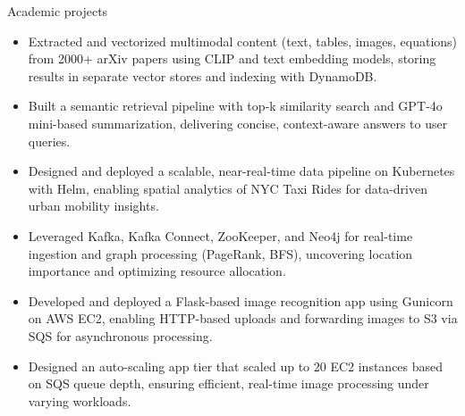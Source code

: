 \documentclass{resume}
\begin{document}
\begin{experienceSection}{Academic projects}

    \projectItem[
        title=RAG Implementation for arXiv Papers,
        duration={Oct 2024 - Nov 2024},
    ]
    \begin{itemize}
        \vspace{-0.5em}
        \itemsep -6pt {}
        \item Extracted and vectorized multimodal content (text, tables, images, equations) from 2000+ arXiv papers using CLIP and text embedding models, storing results in separate vector stores and indexing with DynamoDB.
        \item Built a semantic retrieval pipeline with top‑k similarity search and GPT‑4o mini-based summarization, delivering concise, context-aware answers to user queries.
    \end{itemize}
    
    \projectItem[
        title=Kubernetes based Data Processing Pipeline,
        duration={Oct 2024 - Nov 2024},
    ]
    \begin{itemize}
        \vspace{-0.5em}
        \itemsep -6pt {}
        \item Designed and deployed a scalable, near-real-time data pipeline on Kubernetes with Helm, enabling spatial analytics of NYC Taxi Rides for data-driven urban mobility insights.
        \item Leveraged Kafka, Kafka Connect, ZooKeeper, and Neo4j for real-time ingestion and graph processing (PageRank, BFS), uncovering location importance and optimizing resource allocation.
    \end{itemize}

    \projectItem[
        title=AWS-Based Face Recognition App,
        duration={Feb 2024 - May 2024},
    ]
    \begin{itemize}
        \vspace{-0.5em}
        \itemsep -6pt {}
        \item Developed and deployed a Flask-based image recognition app using Gunicorn on AWS EC2, enabling HTTP-based uploads and forwarding images to S3 via SQS for asynchronous processing.
        \item Designed an auto-scaling app tier that scaled up to 20 EC2 instances based on SQS queue depth, ensuring efficient, real-time image processing under varying workloads.
    \end{itemize}


\end{experienceSection}
\end{document}
